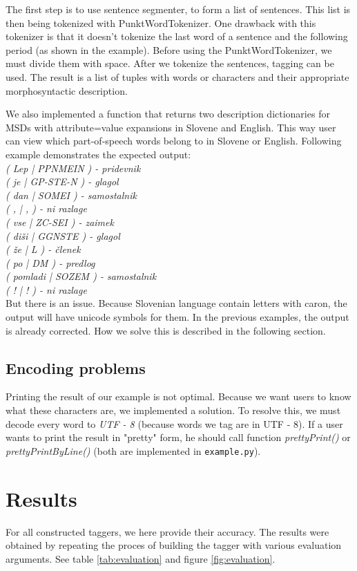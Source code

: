 \documentclass[10pt, conference, compsocconf]{IEEEtran}
\begin{document}
The first step is to use sentence segmenter, to form a list of sentences. This list is then being tokenized with PunktWordTokenizer. One drawback with this tokenizer is that it doesn't tokenize the last word of a sentence and the following period (as shown in the example). Before using the PunktWordTokenizer, we must divide them with space. After we tokenize the sentences, tagging can be used. The result is a list of tuples with words or characters and their appropriate morphosyntactic description. 

We also implemented a function that returns two description dictionaries for MSDs with attribute=value expansions in Slovene and English. This way user can view which part-of-speech words belong to in Slovene or English. Following example demonstrates the expected output:
\\
\textit{( Lep  |  PPNMEIN ) - pridevnik \\
	( je  |  GP-STE-N ) - glagol\\
	( dan  |  SOMEI ) - samostalnik\\
	( ,  |  , ) - ni razlage\\
	( vse  |  ZC-SEI ) - zaimek\\
	( diši  |  GGNSTE ) - glagol\\
	( že  |  L ) - členek\\
	( po  |  DM ) - predlog\\
	( pomladi  |  SOZEM ) - samostalnik\\
	( !  |  ! ) - ni razlage}\\


But there is an issue. Because Slovenian language contain letters with caron, the output will have unicode symbols for them. In the previous examples, the output is already corrected. How we solve this is described in the following section. 
\subsection{Encoding problems} %

Printing the result of our example is not optimal. Because we want users to know what these characters are, we implemented a solution. To resolve this, we must decode every word to \textit{UTF - 8} (because words we tag are in UTF - 8). If a user wants to print the result in "pretty" form, he should call function \textit{prettyPrint()} or \textit{prettyPrintByLine()} (both are implemented in \texttt{example.py}).
\section{Results} %
\label{results}
For all constructed taggers, we here provide their accuracy. The results were obtained by repeating the proces of building the tagger with various evaluation arguments. See table \ref{tab:evaluation} and figure \ref{fig:evaluation}.
\end{document}
